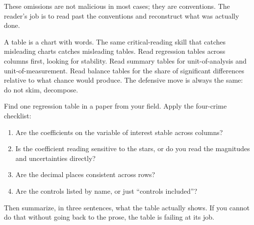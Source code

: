 \documentclass[
  letterpaper,
  11pt,
  twoside,
  openany]{scrbook}
\providecommand{\tightlist}{%
  \setlength{\itemsep}{0pt}\setlength{\parskip}{0pt}}
\begin{document}
These omissions are not malicious in most cases; they are conventions.
The reader's job is to read past the conventions and reconstruct what
was actually done.

\begin{tcolorbox}[enhanced jigsaw, arc=.35mm, bottomrule=.15mm, bottomtitle=1mm, breakable, colback=white, colbacktitle=quarto-callout-warning-color!10!white, colframe=quarto-callout-warning-color-frame, coltitle=black, left=2mm, leftrule=.75mm, opacityback=0, opacitybacktitle=0.6, rightrule=.15mm, title=\textcolor{quarto-callout-warning-color}{\faExclamationTriangle}\hspace{0.5em}{Key insight}, titlerule=0mm, toprule=.15mm, toptitle=1mm]

A table is a chart with words. The same critical-reading skill that
catches misleading charts catches misleading tables. Read regression
tables across columns first, looking for stability. Read summary tables
for unit-of-analysis and unit-of-measurement. Read balance tables for
the share of significant differences relative to what chance would
produce. The defensive move is always the same: do not skim, decompose.

\end{tcolorbox}

\begin{tcolorbox}[enhanced jigsaw, arc=.35mm, bottomrule=.15mm, bottomtitle=1mm, breakable, colback=white, colbacktitle=quarto-callout-tip-color!10!white, colframe=quarto-callout-tip-color-frame, coltitle=black, left=2mm, leftrule=.75mm, opacityback=0, opacitybacktitle=0.6, rightrule=.15mm, title=\textcolor{quarto-callout-tip-color}{\faLightbulb}\hspace{0.5em}{Try this}, titlerule=0mm, toprule=.15mm, toptitle=1mm]

Find one regression table in a paper from your field. Apply the
four-crime checklist:

\begin{enumerate}
\def\labelenumi{\arabic{enumi}.}
\tightlist
\item
  Are the coefficients on the variable of interest stable across
  columns?
\item
  Is the coefficient reading sensitive to the stars, or do you read the
  magnitudes and uncertainties directly?
\item
  Are the decimal places consistent across rows?
\item
  Are the controls listed by name, or just ``controls included''?
\end{enumerate}

Then summarize, in three sentences, what the table actually shows. If
you cannot do that without going back to the prose, the table is failing
at its job.

\end{tcolorbox}
\end{document}
